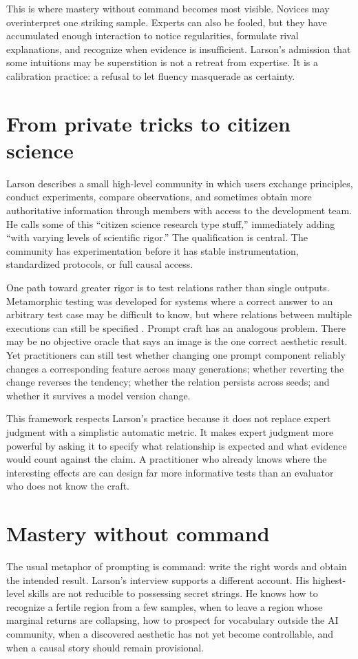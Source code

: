 \documentclass[11pt]{article}
\begin{document}
This is where mastery without command becomes most visible. Novices may overinterpret one striking sample. Experts can also be fooled, but they have accumulated enough interaction to notice regularities, formulate rival explanations, and recognize when evidence is insufficient. Larson's admission that some intuitions may be superstition is not a retreat from expertise. It is a calibration practice: a refusal to let fluency masquerade as certainty.

\section{From private tricks to citizen science}
Larson describes a small high-level community in which users exchange principles, conduct experiments, compare observations, and sometimes obtain more authoritative information through members with access to the development team. He calls some of this ``citizen science research type stuff,'' immediately adding ``with varying levels of scientific rigor.'' The qualification is central. The community has experimentation before it has stable instrumentation, standardized protocols, or full causal access.

One path toward greater rigor is to test relations rather than single outputs. Metamorphic testing was developed for systems where a correct answer to an arbitrary test case may be difficult to know, but where relations between multiple executions can still be specified \cite{ChenCheungYiu1998}. Prompt craft has an analogous problem. There may be no objective oracle that says an image is the one correct aesthetic result. Yet practitioners can still test whether changing one prompt component reliably changes a corresponding feature across many generations; whether reverting the change reverses the tendency; whether the relation persists across seeds; and whether it survives a model version change.

This framework respects Larson's practice because it does not replace expert judgment with a simplistic automatic metric. It makes expert judgment more powerful by asking it to specify what relationship is expected and what evidence would count against the claim. A practitioner who already knows where the interesting effects are can design far more informative tests than an evaluator who does not know the craft.

\section{Mastery without command}
The usual metaphor of prompting is command: write the right words and obtain the intended result. Larson's interview supports a different account. His highest-level skills are not reducible to possessing secret strings. He knows how to recognize a fertile region from a few samples, when to leave a region whose marginal returns are collapsing, how to prospect for vocabulary outside the AI community, when a discovered aesthetic has not yet become controllable, and when a causal story should remain provisional.
\end{document}
